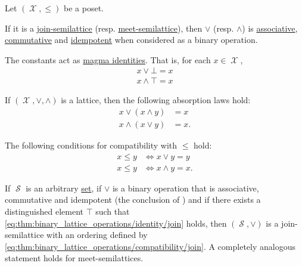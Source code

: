 \begin{proposition}\label{thm:binary_lattice_operations}
  Let \( (\mscrX, \leq) \) be a poset.

  \begin{thmenum}
     If it is a \hyperref[def:semilattice/join]{join-semilattice} (resp. \hyperref[def:semilattice/meet]{meet-semilattice}), then \( \vee \) (resp. \( \wedge \)) is \hyperref[def:magma/associative]{associative}, \hyperref[def:magma/commutative]{commutative} and \hyperref[def:magma/idempotent]{idempotent} when considered as a binary operation.

     The constants act as \hyperref[def:magma_identity]{magma identities}. That is, for each \( x \in \mscrX \),
    \begin{align}
      x \vee \bot = x \label{eq:thm:binary_lattice_operations/identity/join} \\
      x \wedge \top = x \label{eq:thm:binary_lattice_operations/identity/meet}
    \end{align}

     If \( (\mscrX, \vee, \wedge) \) is a lattice, then the following absorption laws hold:
    \begin{align}
      x \vee (x \wedge y) &= x \label{eq:thm:binary_lattice_operations/absorption/join} \\
      x \wedge (x \vee y) &= x \label{eq:thm:binary_lattice_operations/absorption/meet}.
    \end{align}

     The following conditions for compatibility with \( \leq \) hold:
    \begin{align}
      x \leq y &\iff x \vee y = y \label{eq:thm:binary_lattice_operations/compatibility/join} \\
      x \leq y &\iff x \wedge y = x \label{eq:thm:binary_lattice_operations/compatibility/meet}.
    \end{align}

     If \( \mscrS \) is an arbitrary \hyperref[def:set_zfc]{set}, if \( \vee \) is a binary operation that is associative, commutative and idempotent (the conclusion of ) and if there exists a distinguished element \( \top \) such that \eqref{eq:thm:binary_lattice_operations/identity/join} holds, then \( (\mscrS, \vee) \) is a join-semilattice with an ordering defined by \eqref{eq:thm:binary_lattice_operations/compatibility/join}. A completely analogous statement holds for meet-semilattices.


\end{thmenum}
\end{proposition}
